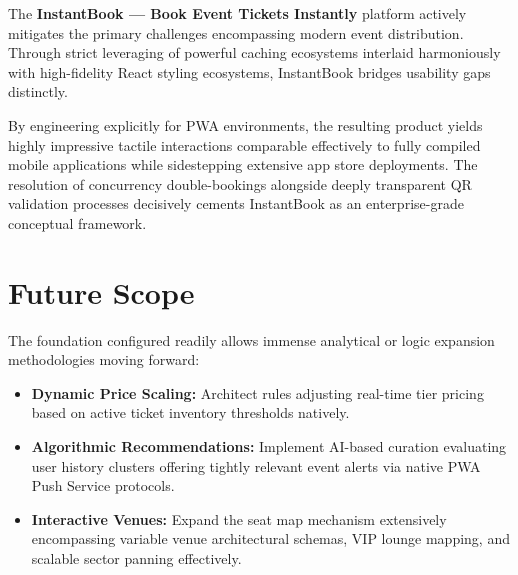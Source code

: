 \documentclass[12pt,a4paper]{report}
\begin{document}
The \textbf{InstantBook — Book Event Tickets Instantly} platform actively mitigates the primary challenges encompassing modern event distribution. Through strict leveraging of powerful caching ecosystems interlaid harmoniously with high-fidelity React styling ecosystems, InstantBook bridges usability gaps distinctly.

By engineering explicitly for PWA environments, the resulting product yields highly impressive tactile interactions comparable effectively to fully compiled mobile applications while sidestepping extensive app store deployments. The resolution of concurrency double-bookings alongside deeply transparent QR validation processes decisively cements InstantBook as an enterprise-grade conceptual framework.

\section{Future Scope}

The foundation configured readily allows immense analytical or logic expansion methodologies moving forward:
\begin{itemize}
    \item \textbf{Dynamic Price Scaling:} Architect rules adjusting real-time tier pricing based on active ticket inventory thresholds natively.
    \item \textbf{Algorithmic Recommendations:} Implement AI-based curation evaluating user history clusters offering tightly relevant event alerts via native PWA Push Service protocols.
    \item \textbf{Interactive Venues:} Expand the seat map mechanism extensively encompassing variable venue architectural schemas, VIP lounge mapping, and scalable sector panning effectively.
\end{itemize}

\renewcommand{\bibname}{References}
\end{document}
